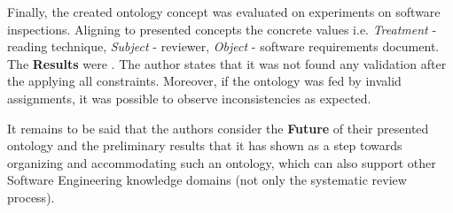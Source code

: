 	Finally, the created ontology concept was evaluated on experiments on software inspections\cite{Bas99}. Aligning to presented concepts the concrete values i.e. \textit{Treatment} - reading technique, \textit{Subject} - reviewer, \textit{Object} - software requirements document. The \textbf{Results} were \frqq\cite[p. 15]{SiyWu12}. The author states that it was not found any validation after the applying all constraints. Moreover, if the ontology was fed by invalid assignments, it was possible to observe inconsistencies as expected.
	
	It remains to be said that the authors consider the \textbf{Future} of their presented ontology and the preliminary results that it has shown as a step towards organizing and accommodating such an ontology, which can also support other Software Engineering knowledge domains (not only the systematic review process).  \newline
	
